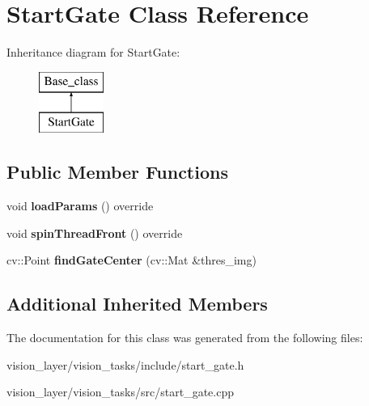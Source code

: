 \hypertarget{classStartGate}{}\section{Start\+Gate Class Reference}
\label{classStartGate}
Inheritance diagram for Start\+Gate\+:\begin{figure}[H]
\begin{center}
\leavevmode
\includegraphics[height=2.000000cm]{classStartGate}
\end{center}
\end{figure}
\subsection*{Public Member Functions}
\begin{DoxyCompactItemize}
\item 
\mbox{\label{classStartGate_a8655684868e818d99e7df9c452a946df}} 
void {\bfseries load\+Params} () override
\item 
\mbox{\label{classStartGate_ad65a9a16086048b0ca9ee46545db19db}} 
void {\bfseries spin\+Thread\+Front} () override
\item 
\mbox{\label{classStartGate_ae52a67ee740e298056b332aec8e4a159}} 
cv\+::\+Point {\bfseries find\+Gate\+Center} (cv\+::\+Mat \&thres\+\_\+img)
\end{DoxyCompactItemize}
\subsection*{Additional Inherited Members}


The documentation for this class was generated from the following files\+:\begin{DoxyCompactItemize}
\item 
vision\+\_\+layer/vision\+\_\+tasks/include/start\+\_\+gate.\+h\item 
vision\+\_\+layer/vision\+\_\+tasks/src/start\+\_\+gate.\+cpp\end{DoxyCompactItemize}
